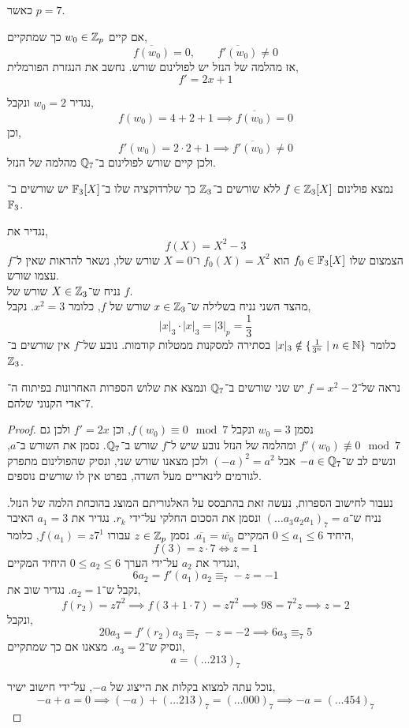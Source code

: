 \subquestion{}
כאשר $p = 7$.
\begin{solution}
	אם קיים $w_0 \in \mathbb{Z}_p$ כך שמתקיים,
	\[
		\overline{f(w_0)} = 0,
		\qquad
		\overline{f'(w_0)} \ne 0
	\]
	אז מהלמה של הנזל יש לפולינום שורש.
	נחשב את הנגזרת הפורמלית,
	\[
		f'
		= 2x + 1
	\]

	נגדיר $w_0 = 2$ ונקבל,
	\[
		f(w_0)
		= 4 + 2 + 1
		\implies \overline{f(w_0)} = 0
	\]
	וכן,
	\[
		f'(w_0)
		= 2 \cdot 2 + 1
		\implies \overline{f'(w_0)} \ne 0
	\]
	ולכן קיים שורש לפולינום ב־$\mathbb{Q}_7$ מהלמה של הנזל.
\end{solution}

\question{}
נמצא פולינום $f \in \mathbb{Z}_3[X]$ ללא שורשים ב־$\mathbb{Z}_3$ כך שלרדוקציה שלו ב־$\mathbb{F}_3[X]$ יש שורשים ב־$\mathbb{F}_3$.
\begin{solution}
	נגדיר את,
	\[
		f(X)
		= X^2 - 3
	\]
	הצמצום שלו $f_0 \in \mathbb{F}_3[X]$ הוא $f_0(X) = X^2$ ו־$X = 0$ שורש שלו, נשאר להראות שאין ל־$f$ עצמו שורש. \\
	נניח ש־$X \in \mathbb{Z}_3$ שורש של $f$. \\
	מהצד השני נניח בשלילה ש־$x \in \mathbb{Z}_3$ שורש של $f$, כלומר $x^2 = 3$.
	נקבל,
	\[
		|x|_3 \cdot |x|_3
		= |3|_p
		= \frac{1}{3}
	\]
	כלומר $|x|_3 \notin \{ \frac{1}{3^n} \mid n \in \mathbb{N} \}$ בסתירה למסקנות ממטלות קודמות.
	נובע של־$f$ אין שורשים ב־$\mathbb{Z}_3$.
\end{solution}

\question{}
נראה של־$f = x^2 - 2$ יש שני שורשים ב־$\mathbb{Q}_7$ ונמצא את שלוש הספרות האחרונות בפיתוח ה־$7$־אדי הקנוני שלהם.
\begin{proof}
	נסמן $w_0 = 3$ ונקבל $f(w_0) \equiv 0 \mod 7$, וכן $f' = 2x$ ולכן גם $f'(w_0) \not\equiv 0 \mod 7$ ומהלמה של הנזל נובע שיש ל־$f$ שורש ב־$\mathbb{Q}_7$.
	נסמן את השורש ב־$a$, ונשים לב ש־$-a \in \mathbb{Q}_7$ אבל ${(-a)}^2 = a^2$ ולכן מצאנו שורש שני, ונסיק שהפולינום מתפרק לגורמים לינאריים מעל השדה, בפרט אין לו שורשים נוספים.

	נעבור לחישוב הספרות, נעשה זאת בהתבסס על האלגוריתם המוצג בהוכחת הלמה של הנזל.
	נניח ש־${(\ldots a_3 a_2 a_1)}_7 = a$ ונסמן את הסכום החלקי על־ידי $r_k$.
	נגדיר את $a_1 = 3$ האיבר היחיד $0 \le a_1 \le 6$ המקיים $\overline{a_1} = \overline{w_0}$.
	נסמן $z \in \mathbb{Z}_p$ עבורו $f(a_1) = z 7^1$, כלומר,
	\[
		f(3) = z \cdot 7
		\iff z = 1
	\]
	ונגדיר את $a_2$ על־ידי הערך $0 \le a_2 \le 6$ היחיד המקיים,
	\[
		6 a_2
		= f'(a_1) a_2
		\equiv_7 -z
		= -1
	\]
	נקבל ש־$a_2 = 1$.
	נגדיר שוב את,
	\[
		f(r_2)
		= z 7^2
		\implies f(3 + 1 \cdot 7)
		= z 7^2
		\implies 98 = 7^2 z
		\implies z = 2
	\]
	ונקבל,
	\[
		20 a_3
		= f'(r_2) a_3
		\equiv_7 -z
		= -2
		\implies 6a_3 \equiv_7 5
	\]
	ונסיק ש־$a_3 = 2$.
	מצאנו אם כך שמתקיים,
	\[
		a = {(\ldots 213)}_7
	\]

	נוכל עתה למצוא בקלות את הייצוג של $-a$, על־ידי חישוב ישיר,
	\[
		-a + a = 0
		\implies (-a) + {(\ldots 213)}_7
		= {(\ldots 000)}_7
		\implies -a
		= {(\ldots 454)}_7
	\]
\end{proof}

